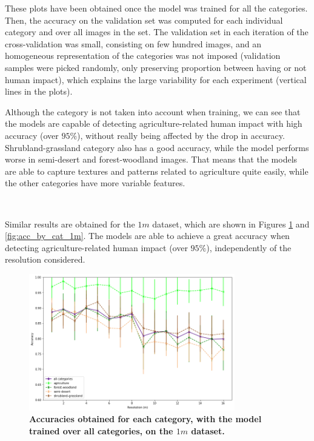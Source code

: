 These plots have been obtained once the model was trained for all the categories. Then, the accuracy on the validation set was computed for each individual category and over all images in the set. The validation set in each iteration of the cross-validation was small, consisting on few hundred images, and an homogeneous representation of the categories was not imposed (validation samples were picked randomly, only preserving proportion between having or not human impact), which explains the large variability for each experiment (vertical lines in the plots).

Although the category is not taken into account when training, we can see that the models are capable of detecting agriculture-related human impact with high accuracy (over $95\%$), without really being affected by the drop in accuracy. Shrubland-grassland category also has a good accuracy, while the model performs worse in semi-desert and forest-woodland images. That means that the models are able to capture textures and patterns related to agriculture quite easily, while the other categories have more variable features.

\

Similar results are obtained for the $1m$ dataset, which are shown in Figures \ref{fig:acc_all_cat_1m} and \ref{fig:acc_by_cat_1m}. The models are able to achieve a great accuracy when detecting agriculture-related human impact (over $95\%$), independently of the resolution considered.

\begin{figure}[H]
	\centering
	\includegraphics[width=0.8\textwidth]{Figures/results/acc_res_all_categories_1m.png}
	\captionsetup{width=1\linewidth}
	\caption{\textbf{Accuracies obtained for each category, with the model trained over all categories, on the $1m$ dataset.}}
	\label{fig:acc_all_cat_1m}
\end{figure}

